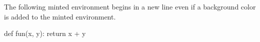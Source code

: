 \documentclass{beamer}
\begin{document}
\begin{frame}[fragile]
The following minted environment begins in a new line even if
a background color is added to the minted environment.
\begin{pythoncode}
  def fun(x, y):
      return x + y
\end{pythoncode}
\end{frame}
\end{document}
